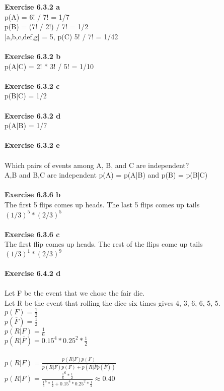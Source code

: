 \documentclass{article}
\begin{document}
\textbf{Exercise 6.3.2 a}\\
p(A) = 6! / 7! = 1/7\\
p(B) = (7! / 2!) / 7! = 1/2\\
|a,b,c,def,g| = 5, p(C) 5! / 7! = 1/42\\\\
\textbf{Exercise 6.3.2 b}\\
p(A|C) = 2! * 3! / 5! = 1/10\\\\
\textbf{Exercise 6.3.2 c}\\
p(B|C) = 1/2\\\\
\textbf{Exercise 6.3.2 d}\\
p(A|B) = 1/7\\\\
\textbf{Exercise 6.3.2 e}\\\\
Which pairs of events among A, B, and C are independent?\\
A,B and B,C are independent p(A) = p(A|B) and p(B) = p(B|C)\\\\
\textbf{Exercise 6.3.6 b}\\
The first 5 flips comes up heads. The last 5 flips comes up tails\\
$(1/3)^5 * (2/3)^5$\\\\
\textbf{Exercise 6.3.6 c}\\
The first flip comes up heads. The rest of the flips come up tails\\
$(1/3)^1 * (2/3)^9$\\\\
\textbf{Exercise 6.4.2 d}\\\\
Let F be the event that we chose the fair die. \\
Let R be the event that rolling the dice six times gives 4, 3, 6, 6, 5, 5.\\
$p(F) = \frac{1}{2}$\\
$p(\overline{F}) = \frac{1}{2}$\\
$p(R|F) = \frac{1}{6}$\\
$p(R|\overline{F}) = 0.15^4 * 0.25^2 * \frac{1}{2}$\\\\
$p(R|F) = \frac{p(R|F)p(F)}{p(R|F)p(F)+p(R|\overline{F}p(\overline{F}))}$\\
$p(R|F) = \frac{\frac{1}{6}^6 * \frac{1}{2}}{\frac{1}{6}^6 * \frac{1}{2} + 0.15^4 * 0.25^2 * \frac{1}{2}} \approx 0.40$
\end{document}

